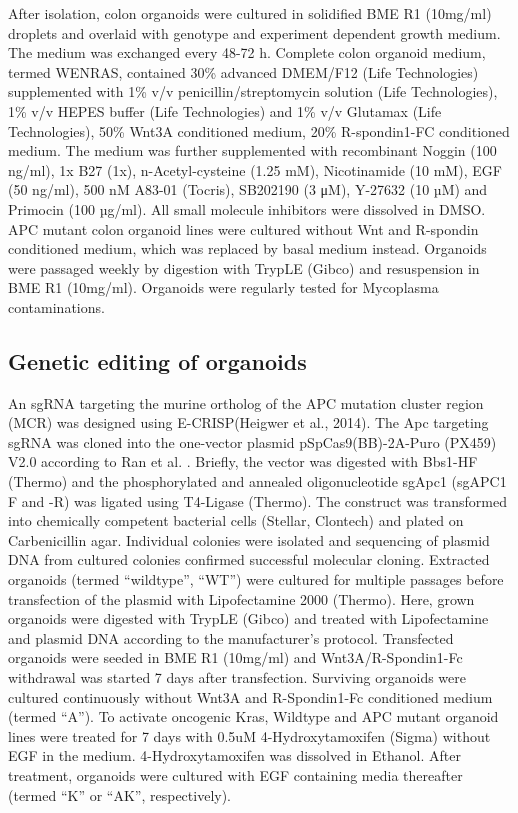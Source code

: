 \begin{flushleft}
After isolation, colon organoids were cultured in solidified BME R1 (10mg/ml) droplets and overlaid with genotype and experiment dependent growth medium. The medium was exchanged every 48-72 h. Complete colon organoid medium, termed WENRAS, contained 30\% advanced DMEM/F12 (Life Technologies) supplemented with 1\% v/v penicillin/streptomycin solution (Life Technologies), 1\% v/v HEPES buffer (Life Technologies) and 1\% v/v Glutamax (Life Technologies), 50\% Wnt3A conditioned medium, 20\% R-spondin1-FC conditioned medium. 
The medium was further supplemented with recombinant Noggin (100 ng/ml), 1x B27 (1x), n-Acetyl-cysteine (1.25 mM), Nicotinamide (10 mM), EGF (50 ng/ml), 500 nM A83-01 (Tocris), SB202190 (3 μM), Y-27632 (10 µM) and Primocin (100 µg/ml). All small molecule inhibitors were dissolved in DMSO. 
APC mutant colon organoid lines were cultured without Wnt and R-spondin conditioned medium, which was replaced by basal medium instead.
Organoids were passaged weekly by digestion with TrypLE (Gibco) and resuspension in BME R1 (10mg/ml). 
Organoids were regularly tested for Mycoplasma contaminations.  

\subsection{Genetic editing of organoids}
An sgRNA targeting the murine ortholog of the APC mutation cluster region (MCR) was designed using E-CRISP(Heigwer et al., 2014). The Apc targeting sgRNA was cloned into the one-vector plasmid pSpCas9(BB)-2A-Puro (PX459) V2.0 according to Ran et al. \cite{Ran2013}. Briefly, the vector was digested with Bbs1-HF (Thermo) and the phosphorylated and annealed oligonucleotide sgApc1 (sgAPC1 F and -R) was ligated using T4-Ligase (Thermo). The construct was transformed into chemically competent bacterial cells (Stellar, Clontech) and plated on Carbenicillin agar. Individual colonies were isolated and sequencing of plasmid DNA from cultured colonies confirmed successful molecular cloning.   
Extracted organoids (termed “wildtype”, “WT”) were cultured for multiple passages before transfection of the plasmid with Lipofectamine 2000 (Thermo). Here, grown organoids were digested with TrypLE (Gibco) and treated with Lipofectamine and plasmid DNA according to the manufacturer’s protocol. Transfected organoids were seeded in BME R1 (10mg/ml) and Wnt3A/R-Spondin1-Fc withdrawal was started 7 days after transfection. Surviving organoids were cultured continuously without Wnt3A and R-Spondin1-Fc conditioned medium (termed “A”).
To activate oncogenic Kras, Wildtype and APC mutant organoid lines were treated for 7 days with 0.5uM 4-Hydroxytamoxifen (Sigma) without EGF in the medium. 4-Hydroxytamoxifen was dissolved in Ethanol. After treatment, organoids were cultured with EGF containing media thereafter (termed “K” or “AK”, respectively).


\end{flushleft}
